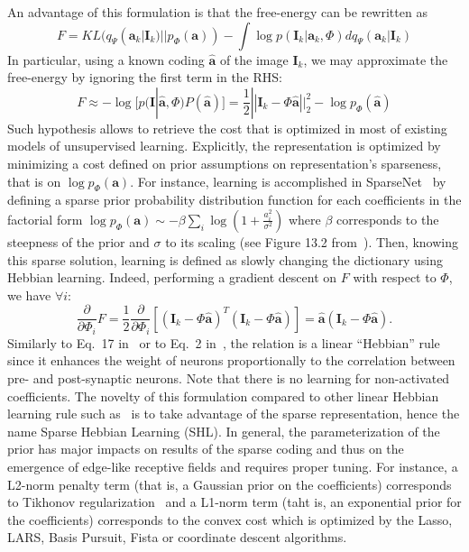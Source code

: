 \documentclass[a4paper, 11pt, draft]{article} %
\newcommand{\coef}{\mathbf{a}} %
\newcommand{\image}{\mathbf{I}} %
\newcommand{\dico}{\Phi} %
\newcommand{\norm}[1]{|\!| #1 |\!|}
\begin{document}
An advantage of this formulation is that the free-energy can be rewritten as
\begin{equation} F = KL( q_\Psi(\coef_k | \image_k) || p_\dico(\coef) ) - \int \log p(\image_k | \coef_k, \dico ) dq_\Psi(\coef_k | \image_k) \end{equation}
In particular, using a known coding $\hat{\coef}$ of the image $\image_k$, we may approximate the free-energy by ignoring the first term in the RHS:
\begin{equation} F \approx - \log [ p(\image | \hat{\coef}, \dico ) P(\hat{\coef}) ] = \frac{1}{2} \norm{\image_k - \dico \hat{\coef}}_2^2 - \log p_\dico(\hat{\coef}) \label{eq:sparse_cost} \end{equation}
Such hypothesis allows to retrieve the cost that is optimized in most of existing models of unsupervised learning. Explicitly, the representation is optimized by minimizing a cost defined on prior assumptions on representation's sparseness, that is on $\log p_\dico( \coef )$. For instance, learning is accomplished in {\sc SparseNet}~\citep{Olshausen97} by defining a sparse prior probability distribution function for each coefficients in the factorial form $\log p_\dico(\coef) \sim -\beta \sum_i \log ( 1 + \frac{a_i^2}{\sigma^2} )$ where $\beta$ corresponds to the steepness of the prior and $\sigma$ to its scaling (see Figure 13.2 from~\citep{Olshausen02}). Then, knowing this sparse solution, learning is defined as slowly changing the dictionary using Hebbian learning.
Indeed, performing a gradient descent on $F$ with respect to $\dico$, we have $\forall i$:
$$ \frac{\partial }{\partial \dico_i } F = \frac{1}{2} \frac{\partial }{\partial \dico_i }[(\image_k - \dico \hat{\coef})^T (\image_k - \dico \hat{\coef})] = \hat{\coef} (\image_k - \dico \hat{\coef}).$$
Similarly to Eq.~17 in~\citep{Olshausen97} or to Eq.~2 in~\citep{Smith06}, the relation is a linear ``Hebbian'' rule~\citep{Hebb49} since it enhances the weight of neurons proportionally to the correlation between pre- and post-synaptic neurons. Note that there is no learning for non-activated coefficients. The novelty of this formulation compared to other linear Hebbian learning rule such as~\citep{Oja82} is to take advantage of the sparse representation, hence the name Sparse Hebbian Learning (SHL).
In general, the parameterization of the prior has major impacts on results of the sparse coding and thus on the emergence of edge-like receptive fields and requires proper tuning. For instance, a L2-norm penalty term (that is, a Gaussian prior on the coefficients) corresponds to Tikhonov regularization~\citep{Tikhonov77} and a L1-norm term (taht is, an exponential prior for the coefficients) corresponds to the convex cost which is optimized by the Lasso, LARS, Basis Pursuit, Fista or coordinate descent algorithms. %
\end{document}
